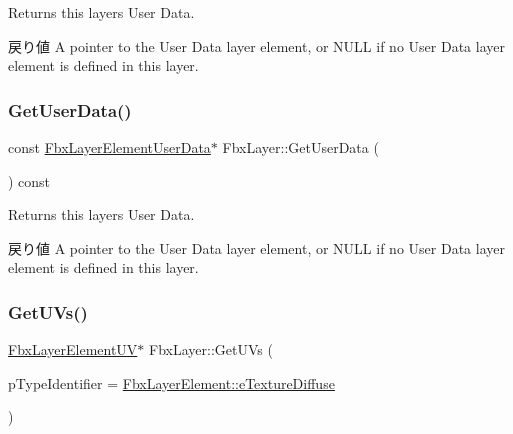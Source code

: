Returns this layer\textquotesingle{}s User Data. \begin{DoxyReturn}{戻り値}
A pointer to the User Data layer element, or {\ttfamily N\+U\+LL} if no User Data layer element is defined in this layer. 
\end{DoxyReturn}
\mbox{\label{class_fbx_layer_ae91e17fb19ef5c6051a714e4bf8249fd}} 
\subsubsection{\texorpdfstring{Get\+User\+Data()}{GetUserData()}\hspace{0.1cm}{\footnotesize\ttfamily [2/2]}}
{\footnotesize\ttfamily const \hyperlink{class_fbx_layer_element_user_data}{Fbx\+Layer\+Element\+User\+Data}$\ast$ Fbx\+Layer\+::\+Get\+User\+Data (\begin{DoxyParamCaption}{ }\end{DoxyParamCaption}) const}

Returns this layer\textquotesingle{}s User Data. \begin{DoxyReturn}{戻り値}
A pointer to the User Data layer element, or {\ttfamily N\+U\+LL} if no User Data layer element is defined in this layer. 
\end{DoxyReturn}
\mbox{\label{class_fbx_layer_aa7b54accfb183e671af671f297dfff7e}} 
\subsubsection{\texorpdfstring{Get\+U\+Vs()}{GetUVs()}\hspace{0.1cm}{\footnotesize\ttfamily [1/2]}}
{\footnotesize\ttfamily \hyperlink{class_fbx_layer_element_u_v}{Fbx\+Layer\+Element\+UV}$\ast$ Fbx\+Layer\+::\+Get\+U\+Vs (\begin{DoxyParamCaption}\item[{\hyperlink{class_fbx_layer_element_a8c95c5cd880b56c776acd379bd86f42c}{Fbx\+Layer\+Element\+::\+E\+Type}}]{p\+Type\+Identifier = {\ttfamily \hyperlink{class_fbx_layer_element_a8c95c5cd880b56c776acd379bd86f42ca09829e6ecf512e7ae04d9ad8de1342fa}{Fbx\+Layer\+Element\+::e\+Texture\+Diffuse}} }\end{DoxyParamCaption})}

